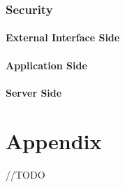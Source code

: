 \documentclass{report}
\begin{document}
		\subsection{Security}

			\subsubsection{External Interface Side}

			\subsubsection{Application Side}

			\subsubsection{Server Side}


\chapter{Appendix}
//TODO
\end{document}

